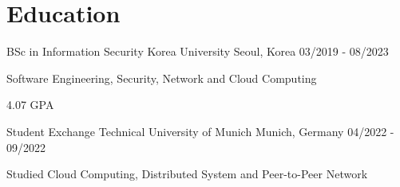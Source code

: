 \vspace{-\acvSectionTopSkip}
\section{Education}
\cventry
{BSc in Information Security} %
{Korea University} %
{Seoul, Korea} %
{03/2019 - 08/2023} %
\begin{cvitems}
\item {Software Engineering, Security, Network and Cloud Computing}
\item {4.07 GPA}
\end{cvitems}

\cventry
{Student Exchange} %
{Technical University of Munich} %
{Munich, Germany} %
{04/2022 - 09/2022} %
\begin{cvitems}
\item {Studied Cloud Computing, Distributed System and Peer-to-Peer Network}
\end{cvitems}
